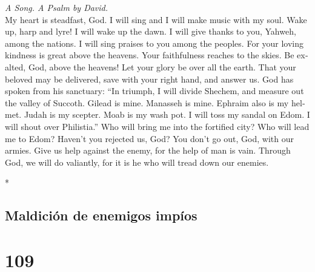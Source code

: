\begin{paracol}{2}
\begin{otherlanguage}{english}
\emph{A Song. A Psalm by David.}\\
 My heart is steadfast, God. I will sing and I will make
music with my soul.  Wake up, harp and lyre! I will wake
up the dawn.  I will give thanks to you, Yahweh, among the
nations. I will sing praises to you among the peoples. 
For your loving kindness is great above the heavens. Your faithfulness
reaches to the skies.  Be exalted, God, above the heavens!
Let your glory be over all the earth.  That your beloved
may be delivered, save with your right hand, and answer us.
 God has spoken from his sanctuary: ``In triumph, I will
divide Shechem, and measure out the valley of Succoth. 
Gilead is mine. Manasseh is mine. Ephraim also is my helmet. Judah is my
scepter.  Moab is my wash pot. I will toss my sandal on
Edom. I will shout over Philistia.''  Who will bring me
into the fortified city? Who will lead me to Edom? 
Haven't you rejected us, God? You don't go out, God, with our armies.
 Give us help against the enemy, for the help of man is
vain.  Through God, we will do valiantly, for it is he
who will tread down our enemies.

\end{otherlanguage}

\switchcolumn[0]*

\hypertarget{maldiciuxf3n-de-enemigos-impuxedos}{%
\subsection{Maldición de enemigos
impíos}\label{maldiciuxf3n-de-enemigos-impuxedos}}

\hypertarget{section-216}{%
\section{109}\label{section-216}}


\end{paracol}
